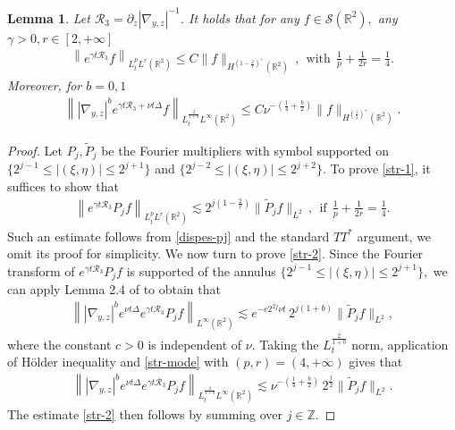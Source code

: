 \documentclass[11pt,reqno]{article}
\newtheorem{lemm}[theo]{Lemma}
\numberwithin{equation}{section}
\newcommand\R{{\mathbb R}}
\let\pa=\partial
\let\f=\frac
\begin{document}
\begin{appendices}
\begin{lemm}\label{lem-str-1}
	Let $\mathcal{R}_3=\pa_z|\nabla_{y,z}|^{-1}$.
	It holds that for any $f\in \mathcal{S}(\R^2),$
    any $\gamma>0, r\in[2,+\infty]$
	\begin{align}\label{str-1}
		\left\| e^{\gamma t\mathcal{R}_3}f \right\|_{L^p_tL^r(\mathbb{R}^2)} \leq C \|f\|_{H^{(1-\f2r)^+}(\mathbb{R}^2)}\,,~~\text{with}~~\f1p+\f{1}{2r}= \f14.
	\end{align}
    Moreover, for $b=0,1$
	\begin{align}\label{str-2}
		\left\| |\nabla_{y,z}|^b e^{\gamma t\mathcal{R}_3+\nu t\Delta}f \right\|_{L^{\f{2}{1+b}}_t L^\infty(\mathbb{R}^2)} \leq C\nu^{-(\f14+\f{b}{2})}\|f\|_{H^{(\f12)^+}(\mathbb{R}^2)}.
	\end{align}
\end{lemm}
\begin{proof}
 Let $P_j, \tilde{P}_j$ be the Fourier multipliers with symbol supported on $\{2^{j-1}\leq |(\xi,\eta)|\leq 2^{j+1}\}$ and $\{2^{j-2}\leq |(\xi,\eta)|\leq 2^{j+2}\}.$
 To prove \eqref{str-1}, it suffices to show that
 \begin{align}\label{str-mode}
     \left\| e^{\gamma t\mathcal{R}_3}P_j f \right\|_{L^p_t L^r(\mathbb{R}^2)} \lesssim  2^{j(1-\f2r)}\|\tilde{P}_j f\|_{L^2} \,,~~\text{if}~~\f1p+\f{1}{2r}= \f14.
 \end{align}
 Such an estimate follows from \eqref{dispes-pj} and the standard  
$TT^\ast$ argument, we omit its proof for simplicity. 
We now turn to prove \eqref{str-2}. Since the  Fourier transform of $ e^{\gamma t\mathcal{R}_3}P_j f$ is supported of the annulus 
 $\{2^{j-1}\leq |(\xi,\eta)|\leq 2^{j+1}\},$ we can apply Lemma 2.4 of \cite{Bahouri-Chemin-Danchin} to obtain that 
  \begin{align*}
     \left\| |\nabla_{y,z}|^b e^{\nu t\Delta}e^{\gamma t\mathcal{R}_3}P_j f \right\|_{L^{\infty}(\mathbb{R}^2)} \lesssim e^{-c 2^{2j}\nu t} \, 2^{j(1+b)}\|\tilde{P}_j f\|_{L^2},
 \end{align*}
where the constant $c>0$ is independent of $\nu.$ %
Taking the $L_t^{\f{2}{1+b}}$ norm, application of 
Hölder inequality and 
\eqref{str-mode} with $(p,r)=(4,+\infty)$ gives that 
\begin{align}\label{str-2-modes}
     \left\| |\nabla_{y,z}|^b e^{\nu t\Delta} e^{\gamma t\mathcal{R}_3}P_j f \right\|_{L^{\f{2}{1+b}}_t L^{\infty}(\mathbb{R}^2)} \lesssim \nu^{-(\f14+\f{b}{2})} \,2^{\f{j}{2}}\|\tilde{P}_j f\|_{L^2}. 
    \end{align}
The estimate \eqref{str-2} then follows by summing over $j\in\mathbb{Z}.$


\end{proof}
\end{appendices}
\end{document}
